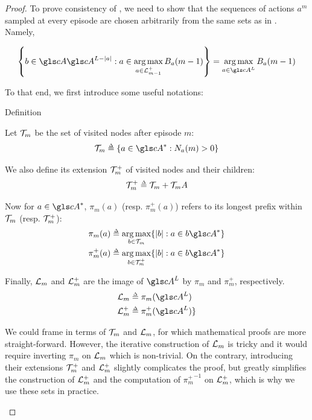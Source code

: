 \begin{proof}
	To prove consistency of , we need to show that the sequences of actions $a^m$ sampled at every episode are chosen arbitrarily from the same sets as in .
	Namely, 
	
	\begin{equation*}
	\left\{ b\in \cA \cA^{L-|a|} : a \in \argmax_{a\in \LL_{m-1}^+} B_a(m-1)\right\} = \argmax_{a\in \cA^L} B_a(m-1)
	\end{equation*}
	
	To that end, we first introduce some useful notations:
	
	\begin{paragraph}{Definition}
		\begin{leftbar}[defnbar]
		Let $\mathcal{T}_m$ be the set of visited nodes after episode $m$:
		\begin{equation*}
		\Tau_m \eqdef \left\{a\in \cA^*: N_a(m) > 0\right\}
		\end{equation*}
		
		We also define its extension $\mathcal{T}_m^+$ of visited nodes and their children:
		\begin{equation*}
		\Tau_m^+ \eqdef \Tau_m + \Tau_m A
		\end{equation*}
		
		Now for $a\in \cA^*$, $\pi_m(a)$ (resp. $\pi_m^+(a)$) refers to its longest prefix within $\mathcal{T}_m$ (resp. $\mathcal{T}_m^+$):
		\begin{align*}
		\pi_m(a) &\eqdef \argmax_{b\in\Tau_m} \{|b|: a\in b \cA^* \} \\
		\pi_m^+(a) &\eqdef \argmax_{b\in\Tau_m^+} \{|b|: a\in b \cA^* \}
		\end{align*}
		
		Finally, $\mathcal{L}_m$ and $\mathcal{L}_m^+$ are the image of $\cA^L$ by $\pi_m$ and $\pi_m^+$, respectively.
		\begin{align*}
		\LL_m &\eqdef \pi_m(\cA^L) \\
		\LL_m^+ &\eqdef \pi_m^+(\cA^L) \}
		\end{align*}
		\end{leftbar}
	\end{paragraph}
	
	\begin{remark}
		\begin{leftbar}[remarkbar]
		We could frame  in terms of $\mathcal{T}_m$ and $\mathcal{L}_m$, for which mathematical proofs are more straight-forward. However, the iterative construction of $\mathcal{L}_m$ is tricky and it would require inverting $\pi_m$ on $\mathcal{L}_m$ which is non-trivial. On the contrary, introducing their extensions  $\mathcal{T}_m^+$ and $\mathcal{L}_m^+$ slightly complicates the proof, but greatly simplifies the construction of $\mathcal{L}_m^+$ and the computation of ${\pi_m^+}^{-1}$ on $\mathcal{L}_m^+$, which is why we use these sets in practice.
		\end{leftbar}
	\end{remark}
	

\end{proof}
